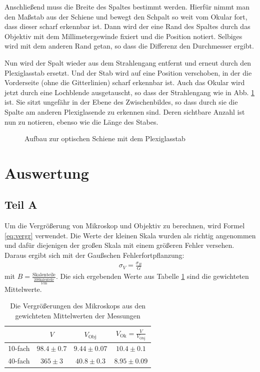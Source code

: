 \documentclass[12pt,a4paper,titlepage,headinclude,bibtotoc]{scrartcl}
\begin{document}
Anschließend muss die Breite des Spaltes bestimmt werden.
Hierfür nimmt man den Maßstab aus der Schiene und bewegt den Schpalt so weit vom Okular fort, dass dieser scharf erkennbar ist.
Dann wird der eine Rand des Spaltes durch das Objektiv mit dem Millimetergewinde fixiert und die Position notiert.
Selbiges wird mit dem anderen Rand getan, so dass die Differenz den Durchmesser ergibt.

Nun wird der Spalt wieder aus dem Strahlengang entfernt und erneut durch den Plexiglasstab ersetzt.
Und der Stab wird auf eine Position verschoben, in der die Vorderseite (ohne die Gitterlinien) scharf erkennbar ist.
Auch das Okular wird jetzt durch eine Lochblende ausgetauscht, so dass der Strahlengang wie in Abb. \ref{fig:strahl3} ist.
Sie sitzt ungefähr in der Ebene des Zwischenbildes, so dass durch sie die Spalte am anderen Plexiglasende zu erkennen sind.
Deren sichtbare Anzahl ist nun zu notieren, ebenso wie die Länge des Stabes.

\begin{figure}[h]
\centering
\def\svgwidth{0.7\linewidth}

\caption{Aufbau zur optischen Schiene mit dem Plexiglasstab}
\label{fig:strahl3}
\end{figure}


\section{Auswertung}
\label{sec:auswertung}
\subsection{Teil A}
Um die Vergrößerung von Mikroskop und Objektiv zu berechnen, wird Formel \eqref{eq:vergr} verwendet.
Die Werte der kleinen Skala wurden als richtig angenommen und dafür diejenigen der großen Skala mit einem größeren Fehler versehen.
Daraus ergibt sich mit der Gaußschen Fehlerfortpflanzung:
\begin{align*}
\sigma_V=\frac{\sigma_B}{G}
\end{align*}
mit $B=\frac{\text{Skalenteile}}{\frac{20\text{Skalenteile}}{1\si{\centi\metre}}}$.
Die sich ergebenden Werte aus Tabelle \ref{tab:vergr} sind die gewichteten Mittelwerte.
\begin{table}[!h]
\centering
\begin{tabular}{|c||c|c|c|}
\hline
 & $V$ & $V_\text{Obj}$ & $V_\text{Ok}=\frac{V}{V_\text{Obj}}$\\\hline\hline
10-fach & $98.4\pm0.7$ & $9.44\pm0.07$ & $10.4\pm 0.1$ \\\hline
40-fach & $365\pm 3$ & $40.8\pm 0.3$ &$8.95\pm0.09$ \\\hline
\end{tabular}
\caption{Die Vergrößerungen des Mikroskops aus den gewichteten Mittelwerten der Messungen}
\label{tab:vergr}
\end{table}
\end{document}
